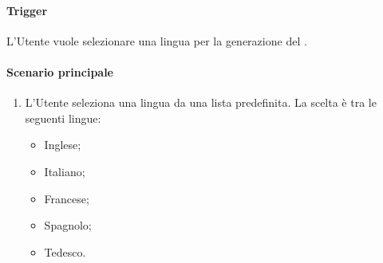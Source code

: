\paragraph*{Trigger}
L'Utente vuole selezionare una lingua per la generazione del .

\paragraph*{Scenario principale}
\begin{enumerate}
  \item L'Utente seleziona una lingua da una lista predefinita. La scelta è tra le seguenti lingue:
    \begin{itemize}
      \item Inglese;
      \item Italiano;
      \item Francese;
      \item Spagnolo;
      \item Tedesco.
    \end{itemize}
\end{enumerate}

